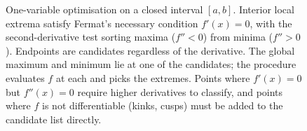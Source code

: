 \begin{figure}[ht]
\caption[Critical points, second-derivative classification, and
endpoint candidates]{One-variable optimisation on a closed interval
$[a, b]$. Interior local extrema satisfy Fermat's necessary condition
$f'(x) = 0$, with the second-derivative test sorting maxima ($f'' < 0$)
from minima ($f'' > 0$). Endpoints are candidates regardless of the
derivative. The global maximum and minimum lie at one of the
candidates; the procedure evaluates $f$ at each and picks the
extremes. Points where $f'(x) = 0$ but $f''(x) = 0$ require higher
derivatives to classify, and points where $f$ is not differentiable
(kinks, cusps) must be added to the candidate list directly.}
\label{fig:vol02:ch05:optimisation-extrema}
\end{figure}
